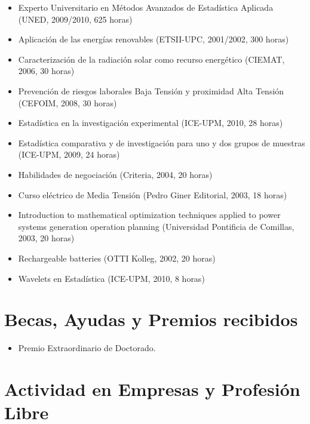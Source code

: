 \documentclass[article, a4paper]{memoir}
\begin{document}
\begin{itemize}
\item Experto Universitario en Métodos Avanzados de Estadística
Aplicada (UNED, 2009/2010, 625 horas)

\item Aplicación de las energías renovables (ETSII-UPC, 2001/2002, 300
horas)

\item Caracterización de la radiación solar como recurso energético
(CIEMAT, 2006, 30 horas)

\item Prevención de riesgos laborales Baja Tensión y proximidad Alta
Tensión (CEFOIM, 2008, 30 horas)

\item Estadística en la investigación experimental (ICE-UPM, 2010, 28
horas)

\item Estadística comparativa y de investigación para uno y dos grupos
de muestras (ICE-UPM, 2009, 24 horas)

\item Habilidades de negociación (Criteria, 2004, 20 horas)

\item Curso eléctrico de Media Tensión (Pedro Giner Editorial, 2003,
18 horas)

\item Introduction to mathematical optimization techniques applied to
power systems generation operation planning (Universidad
Pontificia de Comillas, 2003, 20 horas)

\item Rechargeable batteries (OTTI Kolleg, 2002, 20 horas)

\item Wavelets en Estadística (ICE-UPM, 2010, 8 horas)
\end{itemize}



\section{Becas, Ayudas y Premios recibidos}
\label{sec-10}

\begin{itemize}
\item Premio Extraordinario de Doctorado.
\end{itemize}


\section{Actividad en Empresas y Profesión Libre}
\label{sec-11}
\end{document}
